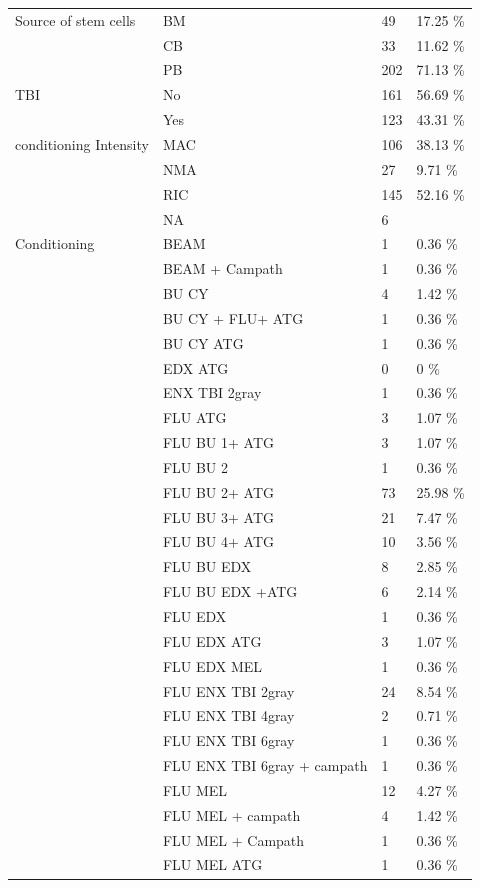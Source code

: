 \documentclass[a4paper,11pt] {article}
\begin{document}
\begin{longtable}{llll}
  Source of stem cells & BM & 49 & 17.25 \% \\ 
   & CB & 33 & 11.62 \% \\ 
   & PB & 202 & 71.13 \% \\ 
  TBI & No & 161 & 56.69 \% \\ 
   & Yes & 123 & 43.31 \% \\ 
  conditioning Intensity & MAC & 106 & 38.13 \% \\ 
   & NMA & 27 & 9.71 \% \\ 
   & RIC & 145 & 52.16 \% \\ 
   & NA & 6 &  \\ 
  Conditioning & BEAM & 1 & 0.36 \% \\ 
   & BEAM + Campath & 1 & 0.36 \% \\ 
   & BU CY  & 4 & 1.42 \% \\ 
   & BU CY + FLU+ ATG & 1 & 0.36 \% \\ 
   & BU CY ATG & 1 & 0.36 \% \\ 
   & EDX ATG & 0 & 0 \% \\ 
   & ENX TBI 2gray & 1 & 0.36 \% \\ 
   & FLU ATG & 3 & 1.07 \% \\ 
   & FLU BU 1+ ATG & 3 & 1.07 \% \\ 
   & FLU BU 2 & 1 & 0.36 \% \\ 
   & FLU BU 2+ ATG & 73 & 25.98 \% \\ 
   & FLU BU 3+ ATG & 21 & 7.47 \% \\ 
   & FLU BU 4+ ATG & 10 & 3.56 \% \\ 
   & FLU BU EDX & 8 & 2.85 \% \\ 
   & FLU BU EDX +ATG & 6 & 2.14 \% \\ 
   & FLU EDX & 1 & 0.36 \% \\ 
   & FLU EDX ATG & 3 & 1.07 \% \\ 
   & FLU EDX MEL & 1 & 0.36 \% \\ 
   & FLU ENX TBI 2gray & 24 & 8.54 \% \\ 
   & FLU ENX TBI 4gray & 2 & 0.71 \% \\ 
   & FLU ENX TBI 6gray & 1 & 0.36 \% \\ 
   & FLU ENX TBI 6gray + campath & 1 & 0.36 \% \\ 
   & FLU MEL & 12 & 4.27 \% \\ 
   & FLU MEL + campath & 4 & 1.42 \% \\ 
   & FLU MEL + Campath & 1 & 0.36 \% \\ 
   & FLU MEL ATG & 1 & 0.36 \% \\ 

\end{longtable}
\end{document}
